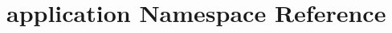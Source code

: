 \hypertarget{namespaceapplication}{}\section{application Namespace Reference}
\label{namespaceapplication}

